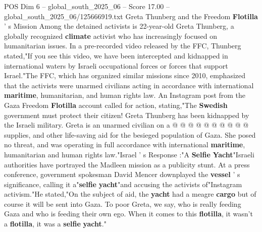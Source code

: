 \begin{textsample}{POS Dim 6 – global\_south\_2025\_06 – Score 17.00 – global\_south\_2025\_06/125666919.txt}
Greta Thunberg and the Freedom \textbf{Flotilla} ' s Mission Among the detained activists is 22-year-old Greta Thunberg, a globally recognized \textbf{climate} activist who has increasingly focused on humanitarian issues.
In a pre-recorded video released by the FFC, Thunberg stated,"If you see this video, we have been intercepted and kidnapped in international waters by Israeli occupational forces or forces that support Israel."The FFC, which has organized similar missions since 2010, emphasized that the activists were unarmed civilians acting in accordance with international \textbf{maritime}, humanitarian, and human rights law.
An Instagram post from the Gaza Freedom \textbf{Flotilla} account called for action, stating,"The \textbf{Swedish} government must protect their citizen!
Greta Thunberg has been kidnapped by the Israeli military.
Greta is an unarmed civilian on a @ @ @ @ @ @ @ @ @ @ supplies, and other life-saving aid for the besieged population of Gaza.
She posed no threat, and was operating in full accordance with international \textbf{maritime}, humanitarian and human rights law."Israel ' s Response :"A \textbf{Selfie} \textbf{Yacht}"Israeli authorities have portrayed the Madleen mission as a publicity stunt.
At a press conference, government spokesman David Mencer downplayed the \textbf{vessel} ' s significance, calling it a"\textbf{selfie} \textbf{yacht}"and accusing the activists of"Instagram activism."He stated,"On the subject of aid, the \textbf{yacht} had a meagre \textbf{cargo} but of course it will be sent into Gaza.
To poor Greta, we say, who is really feeding Gaza and who is feeding their own ego.
When it comes to this \textbf{flotilla}, it wasn't a \textbf{flotilla}, it was a \textbf{selfie} \textbf{yacht}."

\end{textsample}
